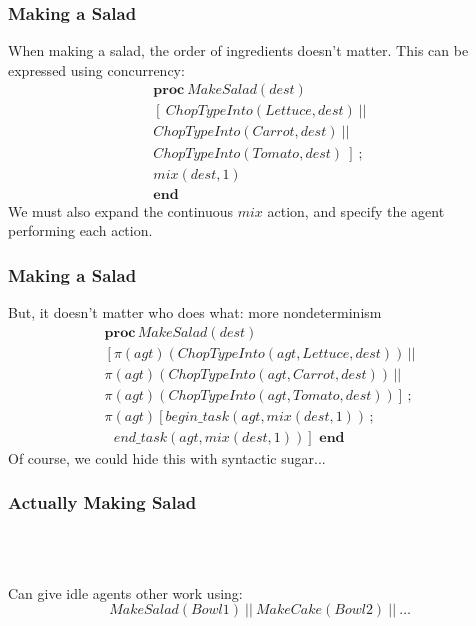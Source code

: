 \documentclass{beamer}
\begin{document}
\begin{frame}
\frametitle{Making a Salad}
When making a salad, the order of ingredients doesn't matter.  This can
be expressed using concurrency:\[
\begin{array}{c}
\mathbf{proc}\ MakeSalad(dest)\\
\left[\ ChopTypeInto(Lettuce,dest)\ ||\right.\\
ChopTypeInto(Carrot,dest)\ ||\\
\left.ChopTypeInto(Tomato,dest)\ \right]\ ;\\
mix(dest,1)\\
\mathbf{end}\end{array}\]
We must also expand the continuous $mix$ action, and specify the agent
performing each action.
\end{frame}

\begin{frame}
\frametitle{Making a Salad}
But, it doesn't matter who does what: more nondeterminism
\[
\begin{array}{c}
\mathbf{proc}\, MakeSalad(dest)\\
\left[\pi(agt)(ChopTypeInto(agt,Lettuce,dest))\,||\right.\\
\pi(agt)(ChopTypeInto(agt,Carrot,dest))\,||\\
\left.\pi(agt)(ChopTypeInto(agt,Tomato,dest))\right]\,;\\
\pi(agt)\left[begin\_task(agt,mix(dest,1))\,;\right.\\
\left.\,\,\,\, end\_task(agt,mix(dest,1))\right]\,\,\mathbf{end}\end{array}\]
\pause
Of course, we could hide this with syntactic sugar...
\end{frame}

\begin{frame}
\frametitle{Actually Making Salad}
\begin{columns}
  \begin{column}{0.5\textwidth}
  \end{column}
  \begin{column}{0.5\textwidth}
  \end{column}
\end{columns}
\ \\
\ \\
\pause
Can give idle agents other work using:\[
MakeSalad(Bowl1)\ ||\ MakeCake(Bowl2)\ ||\ \dots\]
\end{frame}
\end{document}
